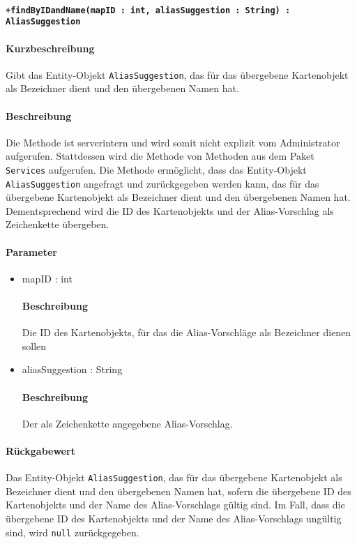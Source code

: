 \paragraph*{\texttt{+findByIDandName(mapID : int, aliasSuggestion : String) : AliasSuggestion}}%
\paragraph*{Kurzbeschreibung}
Gibt das Entity-Objekt \texttt{AliasSuggestion}, das für das übergebene Kartenobjekt als Bezeichner dient und den übergebenen Namen hat.
\paragraph*{Beschreibung}
Die Methode ist serverintern und wird somit nicht explizit vom Administrator aufgerufen.
Stattdessen wird die Methode von Methoden aus dem Paket \texttt{Services} aufgerufen.
Die Methode ermöglicht, dass das Entity-Objekt \texttt{AliasSuggestion} angefragt und zurückgegeben werden kann, das für das übergebene Kartenobjekt als Bezeichner dient und den übergebenen Namen hat.
Dementsprechend wird die ID des Kartenobjekts und der Alias-Vorschlag als Zeichenkette übergeben.
\paragraph*{Parameter}
\begin{itemize}
    \item mapID : int
    		\paragraph*{Beschreibung}
    		Die ID des Kartenobjekts, für das die Alias-Vorschläge als Bezeichner dienen sollen
    	\item aliasSuggestion : String
    		\paragraph*{Beschreibung}
    		Der als Zeichenkette angegebene Alias-Vorschlag.
\end{itemize}
\paragraph*{Rückgabewert}
Das Entity-Objekt \texttt{AliasSuggestion}, das für das übergebene Kartenobjekt als Bezeichner dient und den übergebenen Namen hat, sofern die übergebene ID des Kartenobjekts und der Name des Alias-Vorschlags gültig sind.
Im Fall, dass die übergebene ID des Kartenobjekts und der Name des Alias-Vorschlags ungültig sind, wird \texttt{null} zurückgegeben.
